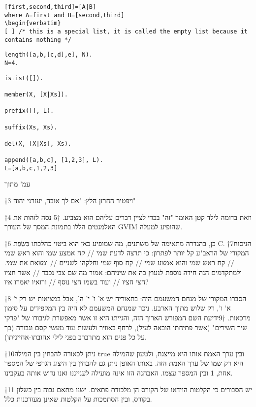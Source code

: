 \begin{טבלא}[!htbp]
\begin{verbatim}
[first,second,third]=[A|B]
where A=first and B=[second,third]
\begin{verbatim}
[ ] /* this is a special list, it is called the empty list because it contains nothing */
\end{verbatim}

\begin{verbatim}
length([a,b,[c,d],e], N).
N=4.
\end{verbatim}

\begin{verbatim}
isₗist([]).

member(X, [X|Xs]).

prefix([], L).

suffix(Xs, Xs).

del(X, [X|Xs], Xs).

append([a,b,c], [1,2,3], L).
L=[a,b,c,1,2,3]
\end{verbatim}

        עמ’ מתוך

†{3} ויפטיר החרזן הלץ: "אם לך אובה, יעזרני יהוה"

†{4} וזאת בדומה לילד קטן האומר "זה" בכדי לציין דברים עליהם הוא מצביע.
†{5} נסה לזהות את האלמנטים הללו בתמונת המסך של העורך GVIM שהופיע למעלה.

†{6} כן, בהגדרה מתאימה של משתנים, מה שמופיע כאן הוא ביטוי כהלכתו בִּשְׂפַת C.
†{7}הניסוח המקורי של הראב"ע קל יותר לפתרון: כי תרצה לדעת שמי // קח אמצע שמי והוא ראש שמי // קח ראש שמי והוא אמצע שמי // קח סוף שמי וחלקהו לשניים // ומצאת את שמי. ולמתקדמים הנה חידה נוספת לנעוץ בה את שיניהם: אמור מה שם צבי נכבד // אשר חציו חצי חציו // ועוד בשמו חצי נוסף // ורואיו יאמרו איו?

†{8} הסברו המקורי של מנחם המשעמם היה: בתאוריה יש א' ו' י' ה', אבל במציאות יש רק י' א' ו', רק שלוש מתוך הארבע. ניכר שמנחם המשעמם לא היה בין המקפידים על סימון מרכאות.
†{9}ידיעת השם המפורש הארוך הזה, והגייתו היא זו אשר מאפשרת לגיבורו של "פרקי שיר השירים" (אשר פתיחתו הובאה לעיל), לרחף באוויר ולעשות עוד מעשי קסם וגבורה (כך על כל פנים הוא מתרברב בפני לילי אהובתו-אחייניתו).

†{10}ניתן לכאורה להבחין בין המילה true ובין ערך האמת אותו היא מייצגת, ולטעון שהמילה היא רק שמו של ערך האמת הזה. באותו האופן ניתן גם להבחין בין היצוג הגרפי של המספר אחת, 1 ובין המספר עצמו. האבחנה הזו אינה מועילה לענייננו ואנו נדוש אותה בעקבינו.

†{11} יש הסבורים כי הקלטות הוידאו של הקורס הן מלכודת פתאים. ישנו מתאם גבוה בין כשלון בקורס, ובין הסתמכות על הקלטות שאינן מעודכנות כלל.


\end{טבלא}
